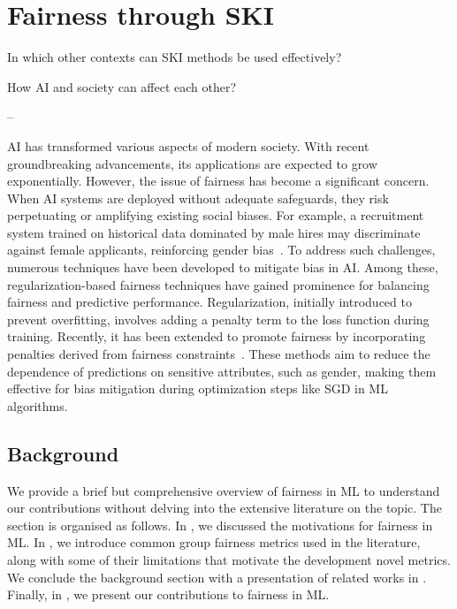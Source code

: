 
\chapter[Fairness through SKI]{Fairness through \gls{SKI}}
\label{ch:fairness-through-ski}

\begin{flushright}
\begin{minipage}{0.5\textwidth}
    In which other contexts can \gls{SKI} methods be used effectively?

    How \gls{AI} and society can affect each other?

    -- \textbf{}
\end{minipage}
\end{flushright}

\minitoc

\Gls{AI} has transformed various aspects of modern society.
%
With recent groundbreaking advancements, its applications are expected to grow exponentially.
%
However, the issue of fairness has become a significant concern.
%
When \gls{AI} systems are deployed without adequate safeguards, they risk perpetuating or amplifying existing social biases.
%
For example, a recruitment system trained on historical data dominated by male hires may discriminate against female applicants, reinforcing gender bias~\cite{kochling2020discriminated}.
%
To address such challenges, numerous techniques have been developed to mitigate bias in \gls{AI}.
%
Among these, regularization-based fairness techniques have gained prominence for balancing fairness and predictive performance.
%
Regularization, initially introduced to prevent overfitting, involves adding a penalty term to the loss function during training.
%
Recently, it has been extended to promote fairness by incorporating penalties derived from fairness constraints~\cite{DBLP:conf/icdm/KamishimaAS11}.
%
These methods aim to reduce the dependence of predictions on sensitive attributes, such as gender, making them effective for bias mitigation during optimization steps like \gls{SGD} in \gls{ML} algorithms.
%

\section{Background}\label{sec:fairness-background}
%
We provide a brief but comprehensive overview of fairness in \gls{ML} to understand our contributions without delving into the extensive literature on the topic.
%
The section is organised as follows.
%
In , we discussed the motivations for fairness in \gls{ML}.
%
In , we introduce common group fairness metrics used in the literature, along with some of their limitations that motivate the development novel metrics.
%
We conclude the background section with a presentation of related works in .
%
Finally, in , we present our contributions to fairness in \gls{ML}.


